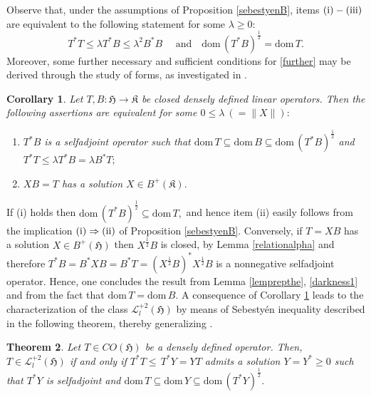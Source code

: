 \documentclass{amsart}
\makeatletter
\newtheorem{theorem}{Theorem}[section]
\newtheorem{corollary}[theorem]{Corollary}
\newcommand{\n}{\|}
\newcommand{\h}{\mathfrak{H}}
\newcommand{\kk}{\mathfrak{K}}
\newcommand{\coh}{CO(\h)}
\newcommand{\D}{\mathrm{dom}\,}
\newcommand{\DT}{\mathrm{dom}\,T }
\newcommand{\DB}{\mathrm{dom}\,B }
\newcommand{\adj}{^*}
\newcommand{\tstar}{T^{*}}
\newcommand{\half}{^{\frac{1}{2}}}
\newcommand{\halftsb}{( T^*B)^{\frac{1}{2}}}
\newcommand{\inclu}{\subseteq}
\newcommand{\lplusk}{B^{+}(\kk)}
\newcommand{\lplus}{B^{+}(\h)}
\newcommand{\ldeux}{\mathcal{L}_l^{+2}(\h)}
\numberwithin{equation}{section}
\renewenvironment{proof}[1][\proofname]{%
   \par\pushQED{\qed}\normalfont%
   \topsep6\p@\@plus6\p@\relax
   \trivlist\item[\hskip\labelsep\bfseries#1\@addpunct{.}]%
   \ignorespaces
}{%
   \popQED\endtrivlist\@endpefalse
}
\renewcommand{\labelenumi}{(\arabic{enumi})}
\makeatother
\begin{document}
Observe that, under the assumptions of Proposition \ref{sebestyenB}, items $\rm (i) - (iii)$ are equivalent to the following statement for some $\lambda \geq 0$:
      \begin{equation}\label{further}
         T^* T  \leq \lambda \tstar B \leq \lambda^2 B\adj  B  \quad \text{   and} \quad
       \D \halftsb =\DT .
       \end{equation}
   Moreover, some further   necessary and  sufficient conditions for \eqref{further}  may be derived  through the study of forms, as investigated in  \cite{Hassi25sebestyen}.
%
\begin{corollary}\label{khsr}
     Let $T,B:\h \rightarrow \kk $ be closed densely defined linear operators. Then the following assertions are equivalent for some $0 \leq \lambda \ (  =\n X\n):$
   \begin{enumerate}\def\labelenumi{\rm(\roman{enumi})}
   \item  $\tstar B$ is a selfadjoint operator such that $\DT \inclu \DB \inclu  \D \halftsb$ and  $T^* T  \leq \lambda \tstar B =\lambda B\adj T;$
   \item $ X B =T$ has a solution $X \in \lplusk.$
      \end{enumerate}
\end{corollary}
\begin{proof}
 If (i) holds then $\D \halftsb \inclu \DT,$ and hence item (ii) easily follows from the implication $\rm(i) \Rightarrow (ii)$ of Proposition \ref{sebestyenB}. Conversely, if $T=XB$ has a solution $X \in \lplus$ then $X\half B$ is closed, by Lemma \ref{relationalpha} and therefore
  $
  \tstar B= B\adj  X B=B\adj T=  (X\half B)\adj X\half B
  $
  is a nonnegative selfadjoint operator. Hence, one concludes the result from Lemma \ref{lemprepthe}, \eqref{darkness1} and from the fact that $\DT= \DB.$
\end{proof}
A consequence of Corollary \ref{khsr} leads to the characterization of the class $\ldeux$ by means of Sebestyén inequality described in the following theorem, thereby generalizing \cite[Theorem 4.5]{product2021}.
%
\begin{theorem}\label{sebldeux}
  Let $T \in \coh$ be a densely defined operator. Then, $T \in \ldeux$ if and only if  $\tstar T \leq    \, \tstar Y = YT$ admits a solution $Y=Y\adj \geq 0$ such that $\tstar Y$ is selfadjoint and  $\DT \inclu  \D Y  \inclu \D( \tstar Y)\half.$
\end{theorem}
\end{document}
